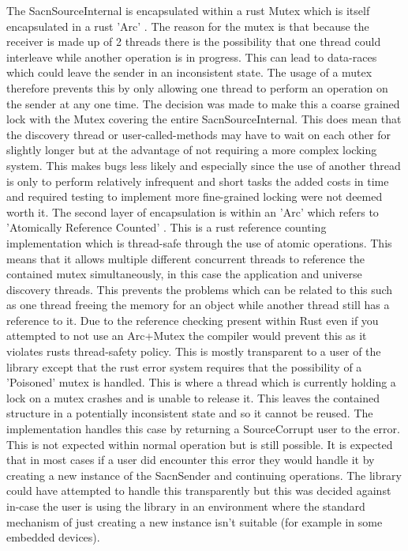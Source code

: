 \documentclass[11pt,a4paper]{article}
\begin{document}
The SacnSourceInternal is encapsulated within a rust Mutex which is itself encapsulated in a rust 'Arc' . The reason for the mutex is that because the receiver is made up of 2 threads there is the possibility that one thread could interleave while another operation is in progress. This can lead to data-races which could leave the sender in an inconsistent state. The usage of a mutex therefore prevents this by only allowing one thread to perform an operation on the sender at any one time. The decision was made to make this a coarse grained lock with the Mutex covering the entire SacnSourceInternal. This does mean that the discovery thread or user-called-methods may have to wait on each other for slightly longer but at the advantage of not requiring a more complex locking system. This makes bugs less likely and especially since the use of another thread is only to perform relatively infrequent and short tasks the added costs in time and required testing to implement more fine-grained locking were not deemed worth it. The second layer of encapsulation is within an 'Arc' which refers to 'Atomically Reference Counted' \cite{RUST_ARC}. This is a rust reference counting implementation which is thread-safe through the use of atomic operations. This means that it allows multiple different concurrent threads to reference the contained mutex simultaneously, in this case the application and universe discovery threads. This prevents the problems which can be related to this such as one thread freeing the memory for an object while another thread still has a reference to it. Due to the reference checking present within Rust even if you attempted to not use an Arc+Mutex the compiler would prevent this as it violates rusts thread-safety policy. This is mostly transparent to a user of the library except that the rust error system requires that the possibility of a 'Poisoned' mutex is handled. This is where a thread which is currently holding a lock on a mutex crashes and is unable to release it. This leaves the contained structure in a potentially inconsistent state and so it cannot be reused. The implementation handles this case by returning a SourceCorrupt user to the error. This is not expected within normal operation but is still possible. It is expected that in most cases if a user did encounter this error they would handle it by creating a new instance of the SacnSender and continuing operations. The library could have attempted to handle this transparently but this was decided against in-case the user is using the library in an environment where the standard mechanism of just creating a new instance isn't suitable (for example in some embedded devices).\\
\end{document}
